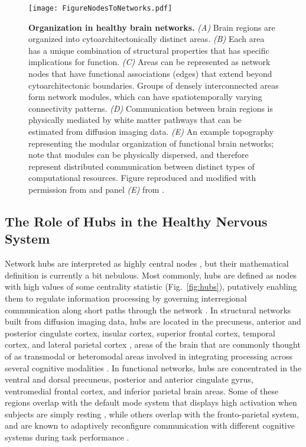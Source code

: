 \documentclass[12pt]{article}
\begin{document}
	\begin{figure}[h!]
	 	\centerline{\texttt{[image: FigureNodesToNetworks.pdf]}}
	 	\caption{\textbf{Organization in healthy brain networks.} \emph{(A)} Brain regions are organized into cytoarchitectonically distinct areas. \emph{(B)} Each area has a unique combination of structural properties that has specific implications for function. \emph{(C)} Areas can be represented as network nodes that have functional associations (edges) that extend beyond cytoarchitectonic boundaries. Groups of densely interconnected areas form network modules, which can have spatiotemporally varying connectivity patterns. \emph{(D)} Communication between brain regions is physically mediated by white matter pathways that can be estimated from diffusion imaging data. \emph{(E)} An example topography representing the modular organization of functional brain networks; note that modules can be physically dispersed, and therefore represent distributed communication between distinct types of computational resources. Figure reproduced and modified with permission from \cite{medaglia2015cognitive} and panel \emph{(E)} from \cite{yeo2011organization}.}
	 	\label{fig:nodestonetworks}
	 	\centering

	 \end{figure}
\newpage

\subsection*{The Role of Hubs in the Healthy Nervous System}

Network hubs are interpreted as highly central nodes \cite{sporns2007brain}, but their mathematical definition is currently a bit nebulous. Most commonly, hubs are defined as nodes with high values of some centrality statistic \cite{sporns2007brain,buckner2009,Warren2014} (Fig.~\ref{fig:hubs}), putatively enabling them to regulate information processing by governing interregional communication along short paths through the network \cite{buckner2009}. In structural networks built from diffusion imaging data, hubs are located in the precuneus, anterior and posterior cingulate cortex, insular cortex, superior frontal cortex, temporal cortex, and lateral parietal cortex \cite{hagmann2008mapping,van2011rich,van2012high,van2013anatomical}, areas of the brain that are commonly thought of as transmodal or heteromodal areas involved in integrating processing across several cognitive modalities \cite{mesulam1998sensation}.  In functional networks, hubs are concentrated in the ventral and dorsal precuneus, posterior and anterior cingulate gyrus, ventromedial frontal cortex, and inferior parietal brain areas. Some of these regions overlap with the default mode system that displays high activation when subjects are simply resting \cite{raichle2001default}, while others overlap with the fronto-parietal system, and are known to adaptively reconfigure communication with different cognitive systems during task performance \cite{cole2013multi,cole2016activity}.
\end{document}
